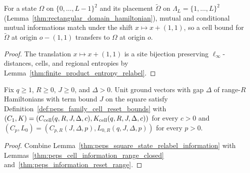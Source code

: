 \begin{lemma}
    \label{thm:peps_square_state_relabel_information}
    \leanok
    For a state $\Omega$ on $\{0,\ldots,L-1\}^2$ and its placement $\tilde\Omega$ on $\Lambda_L=\{1,\ldots,L\}^2$ (Lemma~\ref{thm:rectangular_domain_hamiltonian}), mutual and conditional mutual informations match under the shift $x\mapsto x+(1,1)$, so a cell bound for $\tilde\Omega$ at origin $o-(1,1)$ transfers to $\Omega$ at origin $o$.
\end{lemma}
\begin{proof}
    \leanok
    The translation $x\mapsto x+(1,1)$ is a site bijection preserving $\ell_\infty$-distances, cells, and regional entropies by Lemma~\ref{thm:finite_product_entropy_relabel}.
\end{proof}

\begin{lemma}
    \label{thm:peps_range_cell_reset_bounds}
    \leanok
    Fix $q\ge1$, $R\ge0$, $J\ge0$, and $\Delta>0$. Unit ground vectors with gap $\Delta$ of range-$R$ Hamiltonians with term bound $J$ on the square satisfy Definition~\ref{def:peps_family_cell_reset_bounds} with $(C_1,K)=(C_{\rm cell}(q,R,J,\Delta,c),K_{\rm cell}(q,R,J,\Delta,c))$ for every $c>0$ and $(C_p,L_0)=(C_{p,R}(J,\Delta,p),L_{0,R}(q,J,\Delta,p))$ for every $p>0$.
\end{lemma}
\begin{proof}
    \leanok
    Combine Lemma~\ref{thm:peps_square_state_relabel_information} with Lemmas~\ref{thm:peps_cell_information_range_closed} and~\ref{thm:peps_information_reset_range}.
\end{proof}

